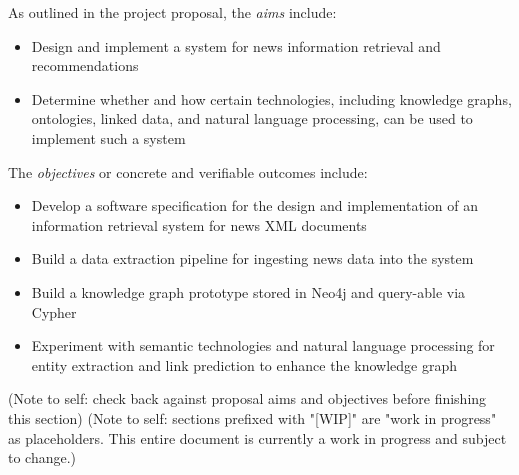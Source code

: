 \documentclass[11pt]{article}
\begin{document}
As outlined in the project proposal\cite{ek-proposal}, the \textit{aims} include:
\begin{itemize}
  \item Design and implement a system for news information retrieval and recommendations
  \item Determine whether and how certain technologies, including knowledge graphs, ontologies, linked data, and natural language processing, can be used to implement such a system
\end{itemize}

The \textit{objectives} or concrete and verifiable outcomes include:
\begin{itemize}
  \item Develop a software specification for the design and implementation of an information retrieval system for news XML documents
  \item Build a data extraction pipeline for ingesting news data into the system
  \item Build a knowledge graph prototype stored in Neo4j and query-able via Cypher
  \item Experiment with semantic technologies and natural language processing for entity extraction and link prediction to enhance the knowledge graph
\end{itemize}

(Note to self: check back against proposal aims and objectives before finishing this section)
(Note to self: sections prefixed with "[WIP]" are "work in progress" as placeholders. This entire document is currently a work in progress and subject to change.)

\newpage



\end{document}
